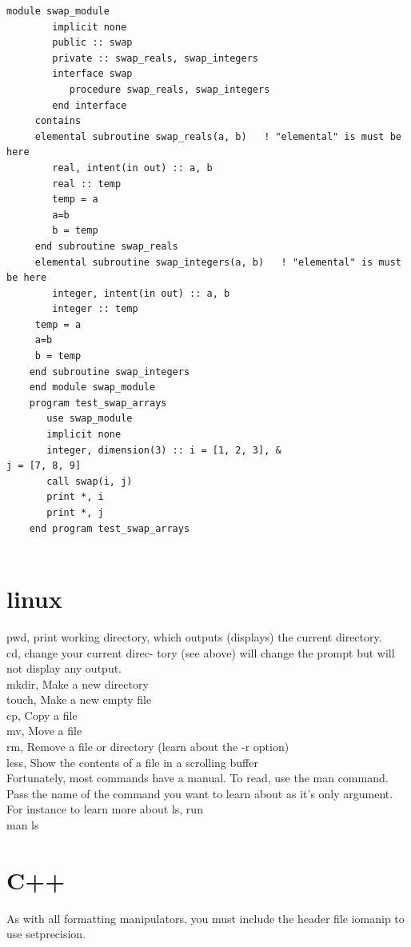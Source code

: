 \begin{verbatim}
module swap_module
        implicit none
        public :: swap
        private :: swap_reals, swap_integers
        interface swap
           procedure swap_reals, swap_integers
        end interface
     contains
     elemental subroutine swap_reals(a, b)   ! "elemental" is must be here
        real, intent(in out) :: a, b
        real :: temp
        temp = a
        a=b
        b = temp
     end subroutine swap_reals
     elemental subroutine swap_integers(a, b)   ! "elemental" is must be here
        integer, intent(in out) :: a, b
        integer :: temp
     temp = a 
     a=b
     b = temp
    end subroutine swap_integers
    end module swap_module
    program test_swap_arrays
       use swap_module
       implicit none
       integer, dimension(3) :: i = [1, 2, 3], &
j = [7, 8, 9]
       call swap(i, j)
       print *, i
       print *, j
    end program test_swap_arrays


\end{verbatim}

        
\section{linux}

pwd, print working directory, which outputs (displays) the current directory.\\
cd,  change your current direc- tory (see above) will change the prompt but will not display any output. \\
mkdir, Make a new directory\\
touch, Make a new empty file\\
cp, Copy a file\\
mv, Move a file\\
rm, Remove a file or directory (learn about the -r option)\\
less, Show the contents of a file in a scrolling buffer\\
\vspace{5mm}
Fortunately, most commands have a manual. To read, use the man command. Pass the name of the command you want to learn about as it’s only argument. For instance to learn more about ls, run\\
man ls


\section{C++}

As with all formatting manipulators, you must include the header file iomanip to use setprecision. 

